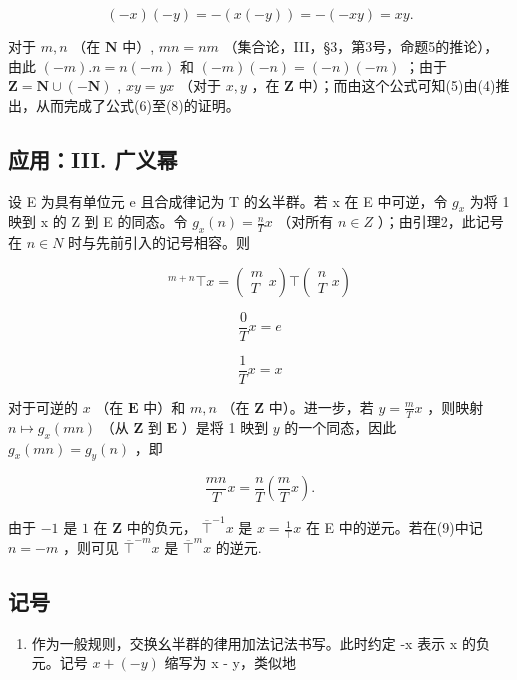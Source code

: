 \[
(- x) (- y) = - (x (- y)) = - (- x y) = x y.
\]

对于 \(m, n\) （在 \(\mathbf{N}\) 中）, \(mn = nm\) （集合论，III，§3，第3号，命题5的推论），由此 \((-m).n = n(-m)\) 和 \((-m)(-n) = (-n)(-m)\) ；由于 \(\mathbf{Z} = \mathbf{N} \cup (-\mathbf{N})\) , \(xy = yx\) （对于 \(x, y\) ，在 \(\mathbf{Z}\) 中）；而由这个公式可知(5)由(4)推出，从而完成了公式(6)至(8)的证明。

\subsection{应用：III. 广义幂}

设 E 为具有单位元 e 且合成律记为 T 的幺半群。若 x 在 E 中可逆，令 \(g_{x}\) 为将 1 映到 x 的 Z 到 E 的同态。令 \(g_{x}(n) = \frac{n}{T} x\) （对所有 \(n \in Z\) ）；由引理2，此记号在 \(n \in N\) 时与先前引入的记号相容。则

\[
{ } ^ { m + n } \top x = \left( \begin{array} { c } m \\ T \end{array} x \right) \top \left( \begin{array} { c } n \\ T \end{array} x \right)\tag{9}
\]

\[
\frac {0}{T} x = e\tag{10}
\]

\[
\frac {1}{T} x = x\tag{11}
\]

对于可逆的 \(x\) （在 \(\mathbf{E}\) 中）和 \(m, n\) （在 \(\mathbf{Z}\) 中）。进一步，若 \(y = \frac{m}{T} x\) ，则映射 \(n \mapsto g_x(mn)\) （从 \(\mathbf{Z}\) 到 \(\mathbf{E}\) ）是将 1 映到 \(y\) 的一个同态，因此 \(g_x(mn) = g_y(n)\) ，即

\[
\frac {m n}{T} x = \frac {n}{T} \left(\frac {m}{T} x\right).\tag{12}
\]

由于 \(-1\) 是 \(1\) 在 \(\mathbf{Z}\) 中的负元， \(\overline{\top}^{-1}x\) 是 \(x = \frac{1}{\top} x\) 在 E 中的逆元。若在(9)中记 \(n = -m\) ，则可见 \(\overline{\top}^{-m}x\) 是 \(\overline{\top}^{m}x\) 的逆元.

\subsection{记号}

\begin{enumerate}
\def\labelenumi{(\alph{enumi})}
\tightlist
\item
  作为一般规则，交换幺半群的律用加法记法书写。此时约定 -x 表示 x 的负元。记号 \(x + (-y)\) 缩写为 x - y，类似地
\end{enumerate}

